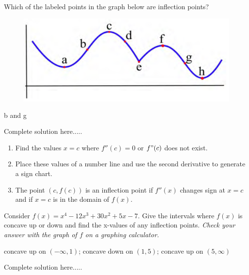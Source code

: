 \begin{example}
Which of the labeled points in the graph below are inflection points?
\begin{figure}[h]
    \centering
    \caption{} 
    \includegraphics[scale=0.6]{images/2ndDervConcavity/inflection2.png} 
    \label{fig:inflection1}
\end{figure}
    \begin{sol}
    b and g
    \end{sol}
    \begin{solL}
    Complete solution here.....
    
    \end{solL}
    
\end{example}
\vspace{0.6in}
\begin{tcolorbox}[title={Concavity Test: Determine Concavity and Inflection Values}]
\begin{enumerate}
    \item Find the values $x=c$ where $f''(c)=0$ or $f"(c)$ does not exist.
    \item Place these values of a number line and use the second derivative to generate a sign chart.
    \item The point $(c,f(c))$ is an inflection point if $f''(x)$ changes sign at $x=c$ and if $x=c$ is in the domain of $f(x)$.
\end{enumerate}
\end{tcolorbox}
\begin{example}
Consider $f(x)=x^4-12x^3+30x^2+5x-7$. Give the intervals where $f(x)$ is concave up or down and find the x-values of any inflection points. \emph{Check your answer with the graph of $f$ on a graphing calculator.}\footnotemark
    \begin{sol}
    concave up on $(-\infty,1)$; concave down on $(1,5)$; concave up on $(5,\infty)$
    \end{sol}
    \begin{solL}
    Complete solution here.....
    
    \end{solL}
    
\end{example}
